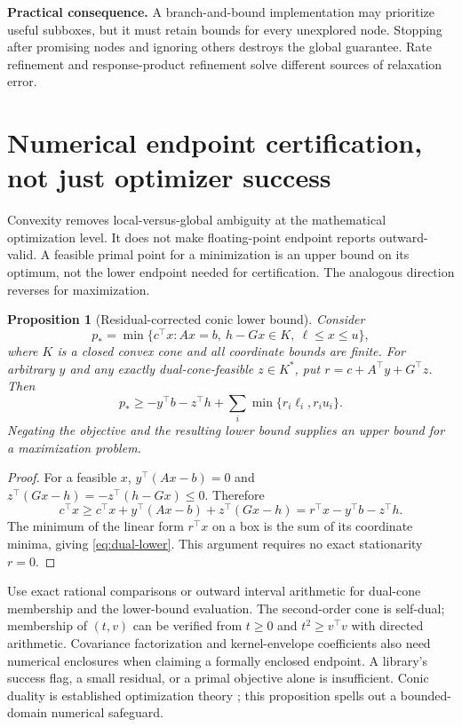 \documentclass[11pt,a4paper]{article}
\newtheorem{proposition}[theorem]{Proposition}
\theoremstyle{definition}\newtheorem{definition}[theorem]{Definition}
\theoremstyle{remark}\newtheorem{remark}[theorem]{Remark}
\begin{document}
\textbf{Practical consequence.} A branch-and-bound implementation may prioritize useful subboxes, but it must retain bounds for every unexplored node. Stopping after promising nodes and ignoring others destroys the global guarantee. Rate refinement and response-product refinement solve different sources of relaxation error.

\section{Numerical endpoint certification, not just optimizer success}
Convexity removes local-versus-global ambiguity at the mathematical optimization level. It does not make floating-point endpoint reports outward-valid. A feasible primal point for a minimization is an upper bound on its optimum, not the lower endpoint needed for certification. The analogous direction reverses for maximization.

\begin{proposition}[Residual-corrected conic lower bound]\label{prop:dual}
Consider
\[
 p_* =\min\{c^\top x:Ax=b,\ h-Gx\in K,\ \ell\le x\le u\},
\]
where $K$ is a closed convex cone and all coordinate bounds are finite. For arbitrary $y$ and any exactly dual-cone-feasible $z\in K^*$, put $r=c+A^\top y+G^\top z$. Then
\begin{equation}
 p_*\ge -y^\top b-z^\top h+\sum_i\min\{r_i\ell_i,r_i u_i\}.
 \label{eq:dual-lower}
\end{equation}
Negating the objective and the resulting lower bound supplies an upper bound for a maximization problem.
\end{proposition}
\begin{proof}
For a feasible $x$, $y^\top(Ax-b)=0$ and
$z^\top(Gx-h)=-z^\top(h-Gx)\le0$. Therefore
\[
 c^\top x\ge c^\top x+y^\top(Ax-b)+z^\top(Gx-h)
 =r^\top x-y^\top b-z^\top h.
\]
The minimum of the linear form $r^\top x$ on a box is the sum of its coordinate minima, giving \eqref{eq:dual-lower}. This argument requires no exact stationarity $r=0$.
\end{proof}

Use exact rational comparisons or outward interval arithmetic for dual-cone membership and the lower-bound evaluation. The second-order cone is self-dual; membership of $(t,v)$ can be verified from $t\ge0$ and $t^2\ge v^\top v$ with directed arithmetic. Covariance factorization and kernel-envelope coefficients also need numerical enclosures when claiming a formally enclosed endpoint. A library's success flag, a small residual, or a primal objective alone is insufficient. Conic duality is established optimization theory \cite{boyd}; this proposition spells out a bounded-domain numerical safeguard.
\end{document}
